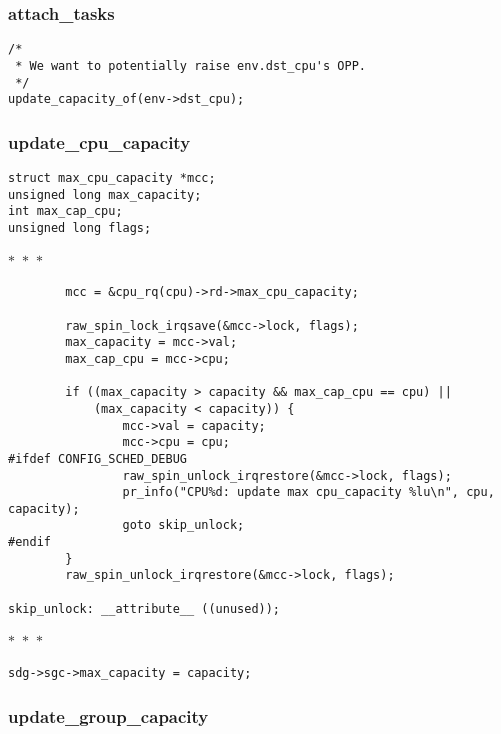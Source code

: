 \documentclass{article}
\newcommand{\divider}{{\begin{center}
  $\ast$~$\ast$~$\ast$
\end{center}}}
\begin{document}
\subsubsection{attach\_tasks}

\begin{verbatim}
/*
 * We want to potentially raise env.dst_cpu's OPP.
 */
update_capacity_of(env->dst_cpu);
\end{verbatim}

\subsubsection{update\_cpu\_capacity}

\begin{verbatim}
struct max_cpu_capacity *mcc;
unsigned long max_capacity;
int max_cap_cpu;
unsigned long flags;
\end{verbatim}
\divider
\begin{verbatim}
        mcc = &cpu_rq(cpu)->rd->max_cpu_capacity;

        raw_spin_lock_irqsave(&mcc->lock, flags);
        max_capacity = mcc->val;
        max_cap_cpu = mcc->cpu;

        if ((max_capacity > capacity && max_cap_cpu == cpu) ||
            (max_capacity < capacity)) {
                mcc->val = capacity;
                mcc->cpu = cpu;
#ifdef CONFIG_SCHED_DEBUG
                raw_spin_unlock_irqrestore(&mcc->lock, flags);
                pr_info("CPU%d: update max cpu_capacity %lu\n", cpu, capacity);
                goto skip_unlock;
#endif
        }
        raw_spin_unlock_irqrestore(&mcc->lock, flags);

skip_unlock: __attribute__ ((unused));
\end{verbatim}
\divider
\begin{verbatim}
sdg->sgc->max_capacity = capacity;
\end{verbatim}

\subsubsection{update\_group\_capacity}
\end{document}
